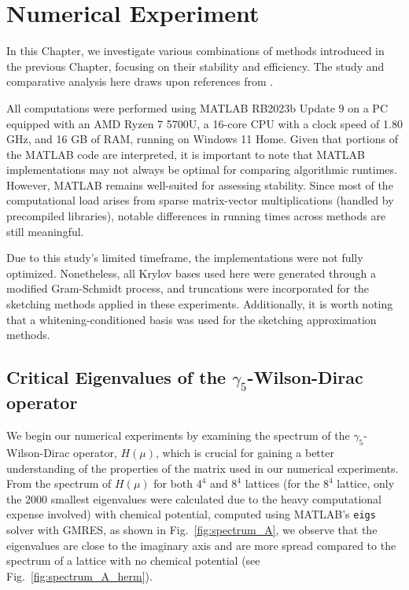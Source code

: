 \chapter{Numerical Experiment}
\label{sec:num_exper}


In this Chapter, we investigate various combinations of methods introduced in the previous Chapter, focusing on their stability and efficiency. The study and comparative analysis here draws upon references from \cite{52, 49, 11, 41}.

All computations were performed using MATLAB RB2023b Update 9 on a PC equipped with an AMD Ryzen 7 5700U, a 16-core CPU with a clock speed of 1.80 GHz, and 16 GB of RAM, running on Windows 11 Home. Given that portions of the MATLAB code are interpreted, it is important to note that MATLAB implementations may not always be optimal for comparing algorithmic runtimes. However, MATLAB remains well-suited for assessing stability. Since most of the computational load arises from sparse matrix-vector multiplications (handled by precompiled libraries), notable differences in running times across methods are still meaningful.

Due to this study's limited timeframe, the implementations were not fully optimized. Nonetheless, all Krylov bases used here were generated through a modified Gram-Schmidt process, and truncations were incorporated for the sketching methods applied in these experiments. Additionally, it is worth noting that a whitening-conditioned basis was used for the sketching approximation methods.


\section{Critical Eigenvalues of the $\gamma_5$-Wilson-Dirac operator}
\label{sec:crit_eig_wil_dirac_oper}

We begin our numerical experiments by examining the spectrum of the \(\gamma_5\)-Wilson-Dirac operator, \(H(\mu)\), which is crucial for gaining a better understanding of the properties of the matrix used in our numerical experiments. From the spectrum of \(H(\mu)\) for both \(4^4\) and \(8^4\) lattices (for the \(8^4\) lattice, only the 2000 smallest eigenvalues were calculated due to the heavy computational expense involved) with chemical potential, computed using MATLAB’s \texttt{eigs} solver with GMRES, as shown in Fig.~\ref{fig:spectrum_A}, we observe that the eigenvalues are close to the imaginary axis and are more spread compared to the spectrum of a lattice with no chemical potential (see Fig.~\ref{fig:spectrum_A_herm}).


